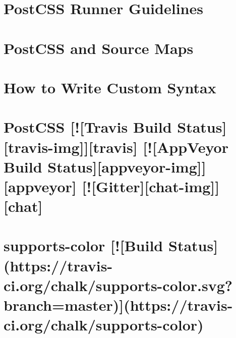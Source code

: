 \documentclass[twoside]{book}
\newcommand{\+}{\discretionary{\mbox{\scriptsize$\hookleftarrow$}}{}{}}
\begin{document}
\chapter{Post\+C\+SS Runner Guidelines}
\label{md__c_1_workspace_demo_src_main_script_node_modules_postcss-loader_node_modules_postcss_docs_guidelines_runner}

\chapter{Post\+C\+SS and Source Maps}
\label{md__c_1_workspace_demo_src_main_script_node_modules_postcss-loader_node_modules_postcss_docs_source-maps}

\chapter{How to Write Custom Syntax}
\label{md__c_1_workspace_demo_src_main_script_node_modules_postcss-loader_node_modules_postcss_docs_syntax}

\chapter{Post\+C\+SS \mbox{[}!\mbox{[}Travis Build Status\mbox{]}\mbox{[}travis-\/img\mbox{]}\mbox{]}\mbox{[}travis\mbox{]} \mbox{[}!\mbox{[}App\+Veyor Build Status\mbox{]}\mbox{[}appveyor-\/img\mbox{]}\mbox{]}\mbox{[}appveyor\mbox{]} \mbox{[}!\mbox{[}Gitter\mbox{]}\mbox{[}chat-\/img\mbox{]}\mbox{]}\mbox{[}chat\mbox{]}}
\label{md__c_1_workspace_demo_src_main_script_node_modules_postcss-loader_node_modules_postcss__r_e_a_d_m_e}

\chapter{supports-\/color \mbox{[}!\mbox{[}Build Status\mbox{]}(https\+://travis-\/ci.org/chalk/supports-\/color.svg?branch=master)\mbox{]}(https\+://travis-\/ci.org/chalk/supports-\/color)}
\label{md__c_1_workspace_demo_src_main_script_node_modules_postcss-loader_node_modules_supports-color_readme}

\end{document}
